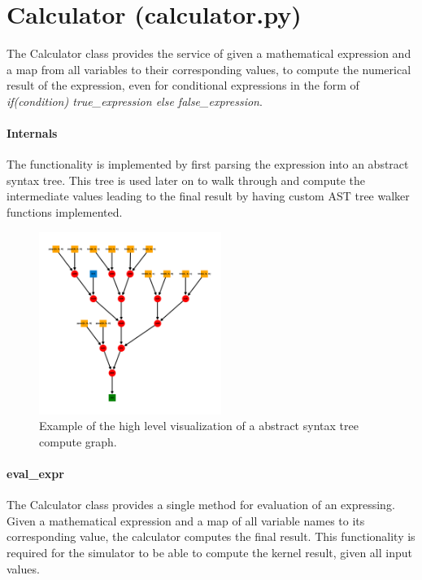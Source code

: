 \section{Calculator (calculator.py)}
The Calculator class provides the service of given a mathematical expression and a map from all variables to their corresponding values, to compute the numerical result of the expression, even for conditional expressions in the form of \textit{if(condition) true\_expression else false\_expression}. 

\paragraph{Internals}
The functionality is implemented by first parsing the expression into an abstract syntax tree. This tree is used later on to walk through and compute the intermediate values leading to the final result by having custom AST tree walker functions implemented. 
\begin{figure}[h]
	\centering
	\includegraphics[height=16em]{images/compute-graph-example.png}
	\caption{Example of the high level visualization of a abstract syntax tree compute graph.}
	\label{fig:compute-graph-example}
\end{figure}


\paragraph{eval\_expr}
The Calculator class provides a single method for evaluation of an expressing. Given a mathematical expression and a map of all variable names to its corresponding value, the calculator computes the final result. This functionality is required for the simulator to be able to compute the kernel result, given all input values.


